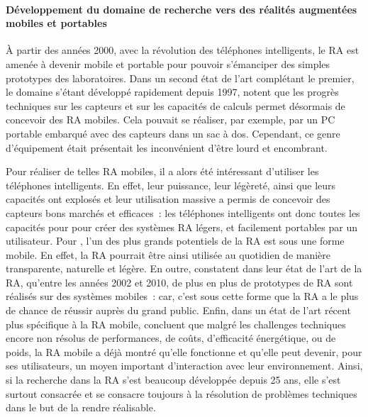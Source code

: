 
\paragraph*{Développement du domaine de recherche vers des réalités augmentées mobiles et portables}
À partir des années 2000, avec la révolution des téléphones intelligents, le RA est amenée à devenir mobile et portable pour pouvoir s'émanciper des simples prototypes des laboratoires. Dans un second état de l'art complétant le premier, le domaine s'étant développé rapidement depuis 1997, \citet{AzumaBaillotBehringerEtAl2001} notent que les progrès techniques sur les capteurs et sur les capacités de calculs permet désormais de concevoir des RA mobiles. Cela pouvait se réaliser, par exemple, par un PC portable embarqué avec des capteurs dans un sac à dos. Cependant, ce genre d'équipement était présentait les inconvénient d'être lourd et encombrant. \citep{DeSaChurchill2013}

Pour réaliser de telles RA mobiles, il a alors été intéressant d'utiliser les téléphones intelligents. En effet, leur puissance, leur légèreté, ainsi que leurs capacités ont explosés et leur utilisation massive a permis de concevoir des capteurs bons marchés et efficaces~: les téléphones intelligents ont donc toutes les capacités pour pour créer des systèmes RA légers, et facilement portables par un utilisateur. \citep{ZhouDuhBillinghurst2008} \citep{DeSaChurchill2013} Pour \citet{VanKrevelenPoelman2010}, l'un des plus grands potentiels de la RA est sous une forme mobile. En effet, la RA pourrait être ainsi utilisée au quotidien de manière transparente, naturelle et légère. En outre, \citet{CarmignianiFurhtAnisettiEtAl2011} constatent dans leur état de l'art de la RA, qu'entre les années 2002 et 2010, de plus en plus de prototypes de RA sont réalisés sur des systèmes mobiles~: car, c'est sous cette forme que la RA a le plus de chance de réussir auprès du grand public. Enfin, dans un état de l'art récent plus spécifique à la RA mobile, \citet{HuangHuiPeyloEtAl2013} concluent que malgré les challenges techniques encore non résolus de performances, de coûts, d'efficacité énergétique, ou de poids, la RA mobile a déjà montré qu'elle fonctionne et qu'elle peut devenir, pour ses utilisateurs, un moyen important d’interaction avec leur environnement. Ainsi, si la recherche dans la RA s'est beaucoup développée depuis 25 ans, elle s'est surtout consacrée et se consacre toujours à la résolution de problèmes techniques dans le but de la rendre réalisable.



